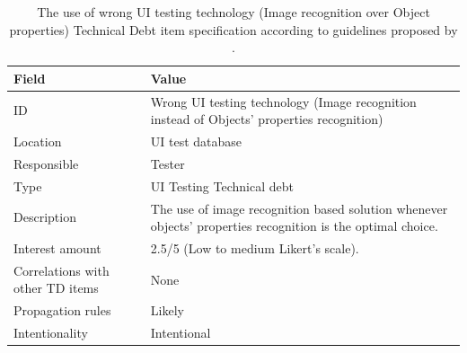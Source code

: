         \begin{table}[!htbp]
		\centering
		\tabulinesep=1.2mm
		\begin{tabu} to \textwidth {|X|X[3]|}

			\hline
			\textbf{Field} & \textbf{Value} \\
			\hline

			ID & Wrong UI testing technology (Image recognition instead of Objects' properties recognition)\\
			\hline

			Location & UI test database \\
			\hline

			Responsible & Tester \\
			\hline

			Type & UI Testing Technical debt \\
			\hline

			Description & The use of image recognition based solution whenever objects' properties recognition is the optimal choice.\\
			\hline



			Interest amount &  2.5/5 (Low to medium Likert's scale). \\
			\hline



			Correlations with other TD items & None\\
			\hline



			Propagation rules & Likely\\
			\hline

			Intentionality & Intentional \\
			\hline

		\end{tabu}
		\caption[Use of wrong UI testing technology - Image recognition over Objects' properties - TD item specification]{The use of wrong UI testing technology (Image recognition over Object properties) Technical Debt item specification according to guidelines proposed by \cite{mapping_study_td}.}
		\label{tab:res-image-vs-property}
	\end{table}


